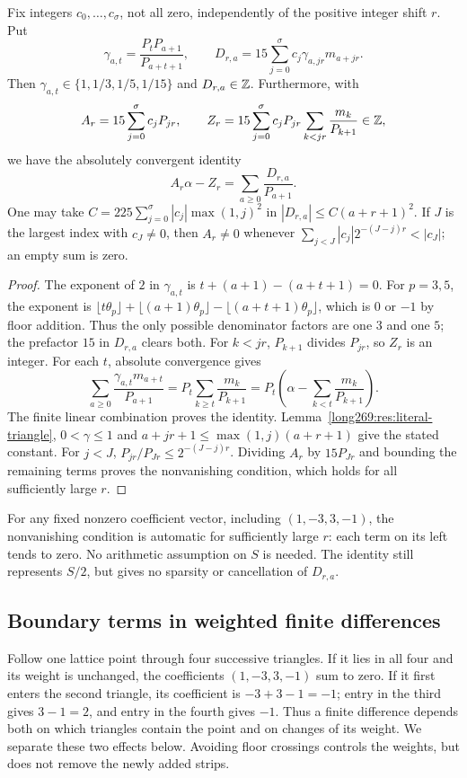\documentclass[11pt]{article}
\theoremstyle{remark}
\theoremstyle{plain}
\begin{document}
\begin{lemma}
\label{long269:res:weighted-shift-identity}
Fix integers $c_0,\ldots,c_\sigma$, not all zero, independently of the
positive integer shift $r$.  Put
\[
 \gamma_{a,t}=\frac{P_tP_{a+1}}{P_{a+t+1}},\qquad
 D_{r,a}=15\sum_{j=0}^{\sigma}c_j\gamma_{a,jr}m_{a+jr}.
\]
Then $\gamma_{a,t}\in\{1,1/3,1/5,1/15\}$ and $D_{r,a}\in\mathbb{Z}$.
Furthermore, with
\[
 A_r=15\sum_{j=0}^{\sigma}c_jP_{jr},\qquad
 Z_r=15\sum_{j=0}^{\sigma}c_jP_{jr}
       \sum_{k<jr}\frac{m_k}{P_{k+1}}\in\mathbb{Z},
\]
we have the absolutely convergent identity
\begin{equation}\label{long269:eq:weighted-shift-identity}
 A_r\alpha-Z_r=\sum_{a\ge0}\frac{D_{r,a}}{P_{a+1}}.
\end{equation}
One may take
$C=225\sum_{j=0}^{\sigma}|c_j|\max(1,j)^2$ in
$|D_{r,a}|\le C(a+r+1)^2$.  If $J$ is the largest index with $c_J\ne0$,
then $A_r\ne0$ whenever
$\sum_{j<J}|c_j|2^{-(J-j)r}<|c_J|$; an empty sum is zero.
\end{lemma}
\begin{proof}
The exponent of $2$ in $\gamma_{a,t}$ is $t+(a+1)-(a+t+1)=0$.
For $p=3,5$, the exponent is
$\lfloor t\theta_p\rfloor+\lfloor(a+1)\theta_p\rfloor
-\lfloor(a+t+1)\theta_p\rfloor$, which is $0$ or $-1$ by floor addition.
Thus the only possible denominator factors are one $3$ and one $5$;
the prefactor $15$ in $D_{r,a}$ clears both.
For $k<jr$, $P_{k+1}$ divides $P_{jr}$, so $Z_r$ is an integer.
For each $t$, absolute convergence gives
\[
 \sum_{a\ge0}\frac{\gamma_{a,t}m_{a+t}}{P_{a+1}}
 =P_t\sum_{k\ge t}\frac{m_k}{P_{k+1}}
 =P_t\left(\alpha-\sum_{k<t}\frac{m_k}{P_{k+1}}\right).
\]
The finite linear combination proves the identity.
Lemma~\ref{long269:res:literal-triangle}, $0<\gamma\le1$ and
$a+jr+1\le\max(1,j)(a+r+1)$ give the stated constant.
For $j<J$, $P_{jr}/P_{Jr}\le2^{-(J-j)r}$.  Dividing $A_r$ by
$15P_{Jr}$ and bounding the remaining terms proves the nonvanishing
condition, which holds for all sufficiently large $r$.
\end{proof}
For any fixed nonzero coefficient vector, including $(1,-3,3,-1)$,
the nonvanishing condition is automatic for sufficiently large $r$:
each term on its left tends to zero.  No arithmetic assumption on $S$ is
needed.  The identity still represents $S/2$, but gives no sparsity or
cancellation of $D_{r,a}$.

\subsection{Boundary terms in weighted finite differences}
\label{long269:sec:boundary-difference}
Follow one lattice point through four successive triangles. If it lies
in all four and its weight is unchanged, the coefficients $(1,-3,3,-1)$
sum to zero. If it first enters the second triangle, its coefficient is
$-3+3-1=-1$; entry in the third gives $3-1=2$, and entry in the fourth
gives $-1$. Thus a finite difference depends both on which triangles
contain the point and on changes of its weight. We separate these two
effects below. Avoiding floor crossings controls the weights, but does
not remove the newly added strips.
\end{document}

